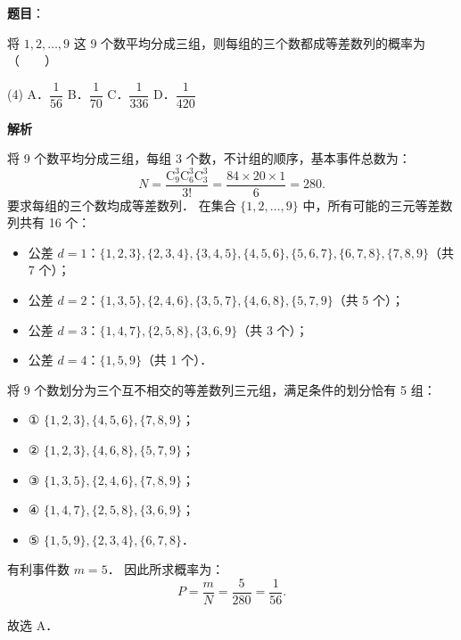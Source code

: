 \begin{answer}

\textbf{题目}：

将 $1, 2, \dots, 9$ 这 9 个数平均分成三组，则每组的三个数都成等差数列的概率为\mbox{（　　）}

\begin{gkopts}(4)
\task A．$\dfrac{1}{56}$
\task B．$\dfrac{1}{70}$
\task C．$\dfrac{1}{336}$
\task D．$\dfrac{1}{420}$
\end{gkopts}

\textbf{解析}

将 9 个数平均分成三组，每组 3 个数，不计组的顺序，基本事件总数为：
\nopagebreak[4]
\[
N = \dfrac{\mathrm{C}_9^3 \mathrm{C}_6^3 \mathrm{C}_3^3}{3!} = \dfrac{84 \times 20 \times 1}{6} = 280.
\]
要求每组的三个数均成等差数列．
在集合 $\{1, 2, \dots, 9\}$ 中，所有可能的三元等差数列共有 16 个：
\begin{itemize}
\item 公差 $d = 1$：$\{1, 2, 3\}, \{2, 3, 4\}, \{3, 4, 5\}, \{4, 5, 6\}, \{5, 6, 7\}, \{6, 7, 8\}, \{7, 8, 9\}$（共 7 个）；
\item 公差 $d = 2$：$\{1, 3, 5\}, \{2, 4, 6\}, \{3, 5, 7\}, \{4, 6, 8\}, \{5, 7, 9\}$（共 5 个）；
\item 公差 $d = 3$：$\{1, 4, 7\}, \{2, 5, 8\}, \{3, 6, 9\}$（共 3 个）；
\item 公差 $d = 4$：$\{1, 5, 9\}$（共 1 个）．
\end{itemize}

将 9 个数划分为三个互不相交的等差数列三元组，满足条件的划分恰有 5 组：
\begin{itemize}
\item ① $\{1, 2, 3\}, \{4, 5, 6\}, \{7, 8, 9\}$；
\item ② $\{1, 2, 3\}, \{4, 6, 8\}, \{5, 7, 9\}$；
\item ③ $\{1, 3, 5\}, \{2, 4, 6\}, \{7, 8, 9\}$；
\item ④ $\{1, 4, 7\}, \{2, 5, 8\}, \{3, 6, 9\}$；
\item ⑤ $\{1, 5, 9\}, \{2, 3, 4\}, \{6, 7, 8\}$．
\end{itemize}
有利事件数 $m = 5$．
因此所求概率为：
\nopagebreak[4]
\[
P = \dfrac{m}{N} = \dfrac{5}{280} = \dfrac{1}{56}.
\]

故选 A．


\end{answer}
